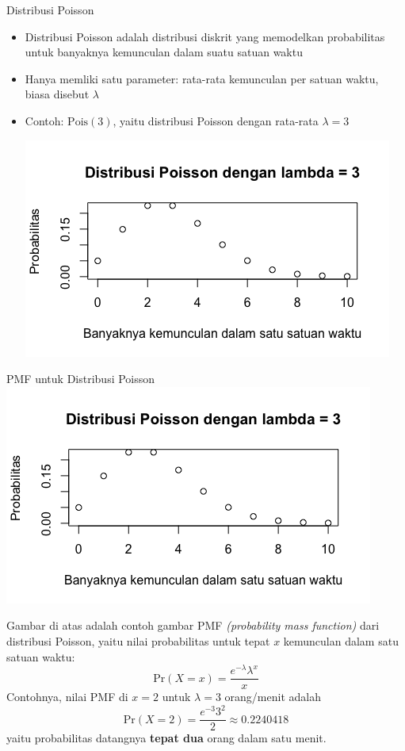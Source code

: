 \documentclass{beamer}
\begin{document}
\begin{frame}{Distribusi Poisson}
    \begin{itemize}
        \item Distribusi Poisson adalah distribusi diskrit yang memodelkan probabilitas untuk banyaknya kemunculan dalam suatu satuan waktu
        \item Hanya memliki satu parameter: rata-rata kemunculan per satuan waktu, biasa disebut \( \lambda \)
        \item Contoh: \( \text{Pois}(3) \), yaitu distribusi Poisson dengan rata-rata \( \lambda = 3 \)

        \includegraphics[scale=0.5]{gambar/fig02_dist_pois.png}
    \end{itemize}
\end{frame}

\begin{frame}{PMF untuk Distribusi Poisson}
    \includegraphics[scale=0.4]{gambar/fig02_dist_pois.png}

    Gambar di atas adalah contoh gambar PMF \textit{(probability mass function)} dari distribusi Poisson, yaitu nilai probabilitas untuk tepat \(x\) kemunculan dalam satu satuan waktu:
    \[ \text{Pr}(X=x) = \frac{e^{-\lambda} \lambda^x}{x} \]
    Contohnya, nilai PMF di \(x=2\) untuk \(\lambda = 3\) orang/menit adalah
    \[ \text{Pr}(X=2) = \frac{e^{-3} 3^2}{2} \approx 0.2240418 \]
    yaitu probabilitas datangnya \textbf{tepat dua} orang dalam satu menit.
\end{frame}
\end{document}
